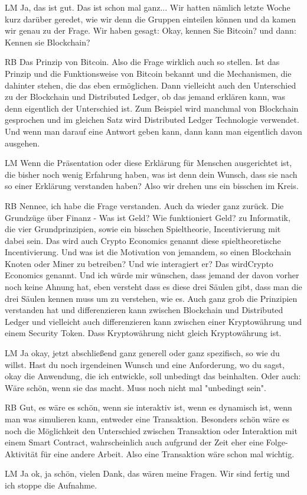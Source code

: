 \begin{xlist}
 \item[LM] Ja, das ist gut. Das ist schon mal ganz... Wir hatten nämlich letzte Woche kurz darüber geredet, wie wir denn die Gruppen einteilen können und da kamen wir genau zu der Frage. Wir haben gesagt: Okay, kennen Sie Bitcoin?  und dann: Kennen sie Blockchain?
 \item[RB] Das Prinzip von Bitcoin. Also die Frage wirklich auch so stellen. Ist das Prinzip und die Funktionsweise von Bitcoin bekannt und die Mechanismen, die dahinter stehen, die das eben ermöglichen.  Dann vielleicht auch den Unterschied zu der Blockchain und Distributed Ledger, ob das jemand erklären kann, was denn eigentlich der Unterschied ist. Zum Beispiel wird manchmal von Blockchain gesprochen und im gleichen Satz wird Distributed Ledger Technologie verwendet. Und wenn man darauf eine Antwort geben kann, dann kann man eigentlich davon ausgehen.
 \item[LM] Wenn die Präsentation oder diese Erklärung für Menschen ausgerichtet ist, die bisher noch wenig Erfahrung haben, was ist denn dein Wunsch, dass sie nach so einer Erklärung verstanden haben? Also wir drehen uns ein bisschen im Kreis.
 \item[RB] Nennee, ich habe die Frage verstanden. Auch da wieder ganz zurück. Die Grundzüge über Finanz - Was ist Geld? Wie funktioniert Geld? zu Informatik, die vier Grundprinzipien, sowie ein bisschen Spieltheorie, Incentivierung mit dabei sein. Das wird auch Crypto Economics genannt diese spieltheoretische Incentivierung. Und was ist die Motivation von jemandem, so einen Blockchain Knoten oder Miner zu betreiben? Und wie interagiert er? Das wirdCrypto Economics genannt. Und ich würde mir wünschen, dass jemand der davon vorher noch keine Ahnung hat, eben versteht dass es diese drei Säulen gibt, dass man die drei Säulen kennen muss um zu verstehen, wie es. Auch ganz grob die Prinzipien verstanden hat und differenzieren kann zwischen Blockchain und Distributed Ledger und vielleicht auch differenzieren kann zwischen einer Kryptowährung und einem  Security Token. Dass Kryptowährung nicht gleich Kryptowährung ist.
 \item[LM] Ja okay, jetzt abschließend ganz generell oder ganz spezifisch, so wie du willst. Hast du noch irgendeinen Wunsch und eine Anforderung, wo du sagst, okay die Anwendung, die ich entwickle, soll unbedingt das beinhalten. Oder auch: Wäre schön, wenn sie das macht. Muss noch nicht mal "unbedingt sein".
 \item[RB] Gut, es wäre es schön, wenn sie interaktiv ist, wenn es dynamisch ist, wenn man was simulieren kann, entweder eine Transaktion. Besonders schön wäre es noch die Möglichkeit den Unterschied zwischen Transaktion oder Interaktion mit einem Smart Contract, wahrscheinlich auch aufgrund der Zeit eher eine Folge- Aktivität für eine andere Arbeit. Also eine Transaktion wäre schon mal wichtig.
 \item[LM] Ja ok, ja schön, vielen Dank, das wären meine Fragen. Wir sind fertig und ich stoppe die Aufnahme.  
\end{xlist}

